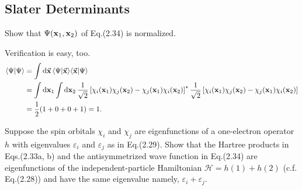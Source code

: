\documentclass[a4paper]{book}
\newcommand*{\dif}{\mathop{}\!\mathrm{d}}
\newcommand{\bfx}{{\bf x}}
\begin{document}
	\subsection{Slater Determinants}
	
	\begin{exercise}
	Show that $\Psi({\bf x}_1,{\bf x}_2)$ of Eq.(2.34) is normalized.
	\end{exercise}
	
	\begin{solution}
	Verification is easy, too.
	\begin{align}
		\langle \Psi | \Psi \rangle &= \int \dif \vec{\bfx} \, \langle \Psi | \vec{\bfx} \rangle \langle \vec{\bfx} | \Psi \rangle \notag \\
		&= \int \dif \bfx_1 \int \dif \bfx_2 \, \frac{1}{\sqrt{2}} \left[ \chi_i(\bfx_1) \chi_j(\bfx_2) - \chi_j(\bfx_1) \chi_i(\bfx_2) \right]^* \frac{1}{\sqrt{2}} \left[ \chi_i(\bfx_1) \chi_j(\bfx_2) - \chi_j(\bfx_1) \chi_i(\bfx_2) \right] \notag \\
		&= \frac{1}{2} ( 1 + 0 + 0 + 1 ) = 1.
	\end{align}
	
	\end{solution}

	\begin{exercise}
	Suppose the spin orbitals $\chi_i$ and $\chi_j$ are eigenfunctions of a one-electron operator $h$ with eigenvalues $\varepsilon_i$ and $\varepsilon_j$ as in Eq.(2.29). Show that the Hartree products in Eqs.(2.33a, b) and the antisymmetrized wave function in Eq.(2.34) are eigenfunctions of the independent-particle Hamiltonian $\mathscr{H} = h(1) + h(2)$ (c.f. Eq.(2.28)) and have the same eigenvalue namely, $\varepsilon_i + \varepsilon_j$. 
	\end{exercise}
	
\end{document}
